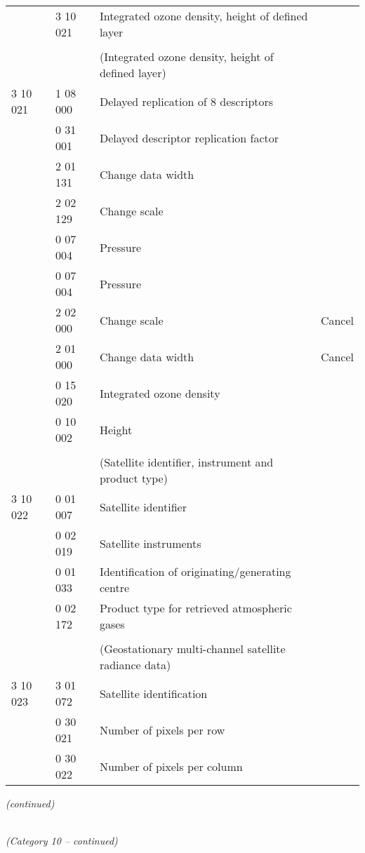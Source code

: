 \begin{longtable}[]{@{}llll@{}}
& 3 10 021 & Integrated ozone density, height of defined layer &\tabularnewline
& & &\tabularnewline
& & (Integrated ozone density, height of defined layer) &\tabularnewline
3 10 021 & 1 08 000 & Delayed replication of 8 descriptors &\tabularnewline
& 0 31 001 & Delayed descriptor replication factor &\tabularnewline
& 2 01 131 & Change data width &\tabularnewline
& 2 02 129 & Change scale &\tabularnewline
& 0 07 004 & Pressure &\tabularnewline
& 0 07 004 & Pressure &\tabularnewline
& 2 02 000 & Change scale & Cancel\tabularnewline
& 2 01 000 & Change data width & Cancel\tabularnewline
& 0 15 020 & Integrated ozone density &\tabularnewline
& 0 10 002 & Height &\tabularnewline
& & &\tabularnewline
& & (Satellite identifier, instrument and product type) &\tabularnewline
3 10 022 & 0 01 007 & Satellite identifier &\tabularnewline
& 0 02 019 & Satellite instruments &\tabularnewline
& 0 01 033 & Identification of originating/generating centre &\tabularnewline
& 0 02 172 & Product type for retrieved atmospheric gases &\tabularnewline
& & &\tabularnewline
& & (Geostationary multi-channel satellite radiance data) &\tabularnewline
3 10 023 & 3 01 072 & Satellite identification &\tabularnewline
& 0 30 021 & Number of pixels per row &\tabularnewline
& 0 30 022 & Number of pixels per column &\tabularnewline
\bottomrule
\end{longtable}

\emph{(continued)}

\emph{\\
(Category 10 -- continued)}

